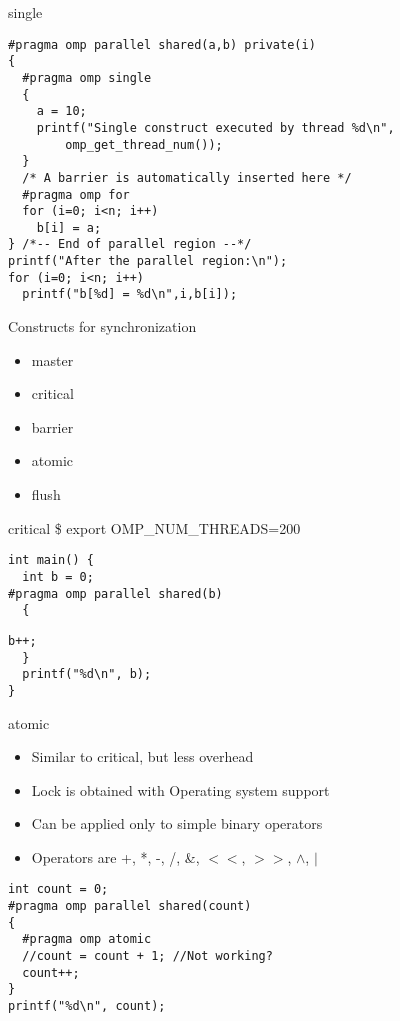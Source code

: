 \documentclass[10pt]{beamer}
\begin{document}
\begin{frame}[fragile]{single}
\begin{Verbatim}[fontsize=\small, formatcom=\color{red}]
#pragma omp parallel shared(a,b) private(i)
{
  #pragma omp single
  {
    a = 10;
    printf("Single construct executed by thread %d\n",
        omp_get_thread_num());
  }
  /* A barrier is automatically inserted here */
  #pragma omp for
  for (i=0; i<n; i++)
    b[i] = a;
} /*-- End of parallel region --*/
printf("After the parallel region:\n");
for (i=0; i<n; i++)
  printf("b[%d] = %d\n",i,b[i]);
\end{Verbatim}
\end{frame}

\begin{frame}{Constructs for synchronization}
\begin{itemize}
\item master
\item critical
\item barrier
\item atomic
\item flush
\end{itemize}
\end{frame}

\begin{frame}[fragile]{critical}
\$ export OMP\_NUM\_THREADS=200
\begin{Verbatim}[fontsize=\small, formatcom=\color{red}]
int main() {        
  int b = 0;
#pragma omp parallel shared(b)
  {
\end{Verbatim}
\begin{Verbatim}[fontsize=\small, formatcom=\color{red}]
    b++;
  }
  printf("%d\n", b);
}
\end{Verbatim}
\end{frame}

\begin{frame}[fragile]{atomic}
\begin{itemize}
\item Similar to critical, but less overhead
\item Lock is obtained with Operating system support
\item Can be applied only to simple binary operators
\item Operators are +, *, -, /, \&, $<<$, $>>$, $\wedge$, $|$
\end{itemize}
\begin{Verbatim}[fontsize=\small, formatcom=\color{red}]
int count = 0;
#pragma omp parallel shared(count)
{
  #pragma omp atomic
  //count = count + 1; //Not working?
  count++;
}
printf("%d\n", count);
\end{Verbatim}
\end{frame}
\end{document}
